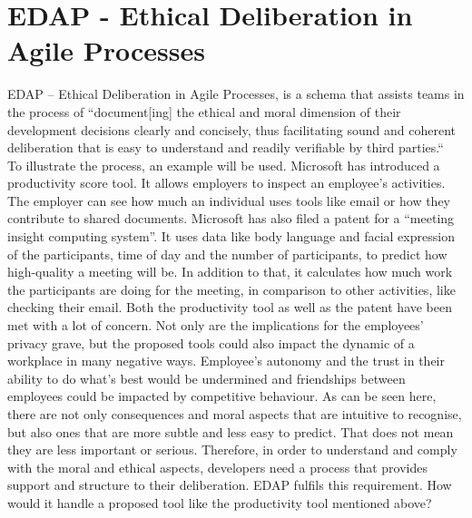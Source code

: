 \section{EDAP - Ethical Deliberation in Agile Processes}
EDAP – Ethical Deliberation in Agile Processes, is a schema that assists teams in the process of “document[ing] the ethical and moral dimension of their development decisions clearly and concisely, thus facilitating sound and coherent deliberation that is easy to understand and readily verifiable by third parties.“\\
To illustrate the process, an example will be used. Microsoft has introduced a productivity score tool. It allows employers to inspect an employee's activities. The employer can see how much an individual uses tools like email or how they contribute to shared documents. Microsoft has also filed a patent for a “meeting insight computing system”. It uses data like body language and facial expression of the participants, time of day and the number of participants, to predict how high-quality a meeting will be. In addition to that, it calculates how much work the participants are doing for the meeting, in comparison to other activities, like checking their email. Both the productivity tool as well as the patent have been met with a lot of concern. Not only are the implications for the employees' privacy grave, but the proposed tools could also impact the dynamic of a workplace in many negative ways. Employee’s autonomy and the trust in their ability to do what's best would be undermined and friendships between employees could be impacted by competitive behaviour. As can be seen here, there are not only consequences and moral aspects that are intuitive to recognise, but also ones that are more subtle and less easy to predict. That does not mean they are less important or serious. Therefore, in order to understand and comply with the moral and ethical aspects, developers need a process that provides support and structure to their deliberation. EDAP fulfils this requirement. How would it handle a proposed tool like the productivity tool mentioned above?\\
